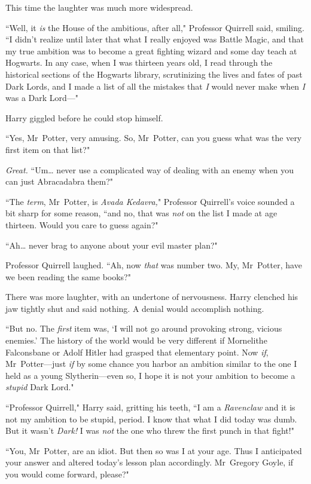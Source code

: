 This time the laughter was much more widespread.

``Well, it \emph{is} the House of the ambitious, after all," Professor Quirrell said, smiling. ``I didn't realize until later that what I really enjoyed was Battle Magic, and that my true ambition was to become a great fighting wizard and some day teach at Hogwarts. In any case, when I was thirteen years old, I read through the historical sections of the Hogwarts library, scrutinizing the lives and fates of past Dark Lords, and I made a list of all the mistakes that \emph{I} would never make when \emph{I} was a Dark Lord—"

Harry giggled before he could stop himself.

``Yes, Mr~Potter, very amusing. So, Mr~Potter, can you guess what was the very first item on that list?"

\emph{Great.} ``Um{\ldots} never use a complicated way of dealing with an enemy when you can just Abracadabra them?"

``The \emph{term}, Mr~Potter, is \emph{Avada Kedavra,}" Professor Quirrell's voice sounded a bit sharp for some reason, ``and no, that was \emph{not} on the list I made at age thirteen. Would you care to guess again?"

``Ah{\ldots} never brag to anyone about your evil master plan?"

Professor Quirrell laughed. ``Ah, now \emph{that} was number two. My, Mr~Potter, have we been reading the same books?"

There was more laughter, with an undertone of nervousness. Harry clenched his jaw tightly shut and said nothing. A denial would accomplish nothing.

``But no. The \emph{first} item was, `I will not go around provoking strong, vicious enemies.' The history of the world would be very different if Mornelithe Falconsbane or Adolf Hitler had grasped that elementary point. Now \emph{if}, Mr~Potter—just \emph{if} by some chance you harbor an ambition similar to the one I held as a young Slytherin—even so, I hope it is not your ambition to become a \emph{stupid} Dark Lord."

``Professor Quirrell," Harry said, gritting his teeth, ``I am a \emph{Ravenclaw} and it is not my ambition to be stupid, period. I know that what I did today was dumb. But it wasn't \emph{Dark!} I was \emph{not} the one who threw the first punch in that fight!"

``You, Mr~Potter, are an idiot. But then so was I at your age. Thus I anticipated your answer and altered today's lesson plan accordingly. Mr~Gregory Goyle, if you would come forward, please?"

